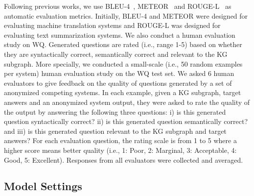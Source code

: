 \documentclass[journal]{IEEEtran}
\begin{document}
Following previous works, we use BLEU-4~\cite{papineni2002bleu}, METEOR~\cite{banerjee2005meteor} and ROUGE-L~\cite{lin2004rouge}
as automatic evaluation metrics. 
Initially, BLEU-4 and METEOR were designed for evaluating machine translation systems and ROUGE-L was designed for evaluating text summarization systems.
We also conduct a human evaluation study on WQ.
Generated questions are rated (i.e., range 1-5) based on whether they are syntactically correct, semantically correct and relevant to the KG subgraph.
More specially, we conducted a small-scale (i.e., 50 random examples per system) human evaluation study on the WQ test set.
We asked 6 human evaluators to give feedback on the quality of questions generated by a set of anonymized competing systems.
In each example, given a KG subgraph, target answers and an anonymized system output, they were asked to rate the quality of the output by answering the following three questions: i) is this generated question syntactically correct? ii) is this generated question semantically correct? and iii) is this generated question relevant to the KG subgraph and target answers?
For each evaluation question, the rating scale is from 1 to 5 where a higher score means better quality (i.e., 1: Poor, 2: Marginal, 3: Acceptable, 4: Good, 5: Excellent).
Responses from all evaluators were collected and averaged. 




\subsection{Model Settings}\label{sec:model_settings}
\end{document}
